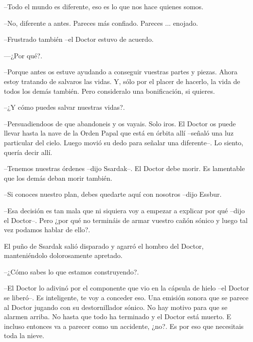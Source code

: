--Todo el mundo es diferente, eso es lo que nos hace quienes somos.



--No, diferente a antes. Pareces más confiado. Pareces ... enojado.



--Frustrado también --el Doctor estuvo de acuerdo.



—¿Por qué?.



--Porque antes os estuve ayudando a conseguir vuestras partes y piezas. Ahora estoy tratando de salvaros las vidas. Y, sólo por el placer de hacerlo, la vida de todos los demás también. Pero consideralo una bonificación, si quieres.



--¿Y cómo puedes salvar nuestras vidas?.



--Persuadiendoos de que abandoneis y os vayais. Solo iros. El Doctor os puede llevar hasta la nave de la Orden Papal que está en órbita allí --señaló una luz particular del cielo. Luego movió su dedo para señalar una diferente--. Lo siento, quería decir allí.



--Tenemos nuestras órdenes --dijo Ssardak--. El Doctor debe morir. Es lamentable que los demás deban morir también.



--Si conoces nuestro plan, debes quedarte aquí con nosotros --dijo Essbur.



--Esa decisión es tan mala que ni siquiera voy a empezar a explicar por qué --dijo el Doctor--.  Pero ¿por qué no termináis de armar vuestro cañón sónico y luego tal vez podamos hablar de ello?. 



El puño de Ssardak salió disparado y agarró el hombro del Doctor, manteniéndolo dolorosamente apretado.

--¿Cómo sabes lo que estamos construyendo?.



--El Doctor lo adivinó por el componente que vio en la cápsula de hielo --el Doctor se liberó--. Es inteligente, te voy a conceder eso. Una emisión sonora que se parece al Doctor jugando con su destornillador sónico. No hay motivo para que se alarmen arriba. No hasta que todo ha terminado y el Doctor está muerto. E incluso entonces va a parecer como un accidente, ¿no?. Es por eso que necesitais toda la nieve. 



